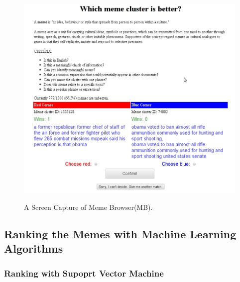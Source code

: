 \documentclass{sig-alternate}
\begin{document}
\begin{figure}[p]
	\begin{center}
		{\includegraphics[width=\textwidth]{game.jpg}}
	\end{center}
	\caption{A Screen Capture of Meme Browser(MB).}
	\label{fig:game}
\end{figure}



\subsection{Ranking the Memes with Machine Learning Algorithms}
\subsubsection{Ranking with Supoprt Vector Machine}
\end{document}
